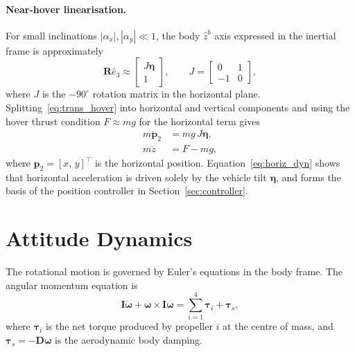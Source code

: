 \paragraph{Near-hover linearisation.}
For small inclinations $|\alpha_x|,|\alpha_y|\ll 1$, the body $\hat{z}^b$
axis expressed in the inertial frame is approximately
\begin{equation}
    \boldsymbol{R}\hat{e}_3 \approx
        \begin{bmatrix} J\boldsymbol{\eta} \\ 1 \end{bmatrix},
    \qquad
    J = \begin{bmatrix} 0 & 1 \\ -1 & 0 \end{bmatrix},
    \label{eq:zb_approx}
\end{equation}
where $J$ is the $-90^{\circ}$ rotation matrix in the horizontal plane.
Splitting~\eqref{eq:trans_hover} into horizontal and vertical components
and using the hover thrust condition $F\approx mg$ for the horizontal term
gives
\begin{align}
    m\ddot{\boldsymbol{p}}_2 &= mg\,J\boldsymbol{\eta},
    \label{eq:horiz_dyn}\\
    m\ddot{z} &= F - mg,
    \label{eq:vert_dyn}
\end{align}
where $\boldsymbol{p}_2 = [x,\,y]^{\top}$ is the horizontal position.
Equation~\eqref{eq:horiz_dyn} shows that horizontal acceleration is driven
solely by the vehicle tilt $\boldsymbol{\eta}$, and forms the basis of the
position controller in Section~\ref{sec:controller}.

\section{Attitude Dynamics}
\label{sec:attitude_dynamics}

The rotational motion is governed by Euler's equations in the body frame.
The angular momentum equation is
\begin{equation}
    \boldsymbol{I}\dot{\boldsymbol{\omega}}
        + \boldsymbol{\omega}\times\boldsymbol{I}\boldsymbol{\omega}
        = \sum_{i=1}^{4}\boldsymbol{\tau}_i
          + \boldsymbol{\tau}_s,
    \label{eq:euler}
\end{equation}
where $\boldsymbol{\tau}_i$ is the net torque produced by propeller $i$
at the centre of mass, and $\boldsymbol{\tau}_s = -\boldsymbol{D}\boldsymbol{\omega}$
is the aerodynamic body damping.

